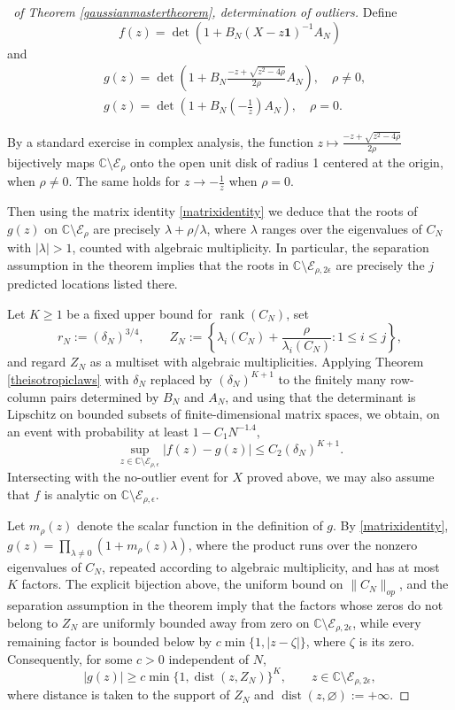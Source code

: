 \documentclass[11pt,reqno]{amsart}
\theoremstyle{plain}
\theoremstyle{remark}
\numberwithin{equation}{section}
\begin{document}
\begin{proof}[\proofname\ of Theorem \ref{gaussianmastertheorem}, determination of outliers]



Define $$f(z)=\det(1+B_N(X-z\mathbf{1})^{-1}A_N)$$
and 
$$\begin{aligned}&g(z)=\det(1+B_N\frac{-z+\sqrt{z^2-4\rho}}{2\rho}A_N),\quad \rho\neq 0,\\&g(z)=\det(1+B_N(-\frac{1}{z})A_N),\quad \rho=0.\end{aligned}$$

By a standard exercise in complex analysis, the function $z\mapsto \frac{-z+\sqrt{z^2-4\rho}}{2\rho}$ bijectively maps $\mathbb{C}\setminus\mathcal{E}_\rho$ onto the open unit disk of radius 1 centered at the origin, when $\rho\neq 0$. The same holds for $z\to-\frac{1}{z}$ when $\rho=0$.

Then using the matrix identity \eqref{matrixidentity} we deduce that the roots of $g(z)$ on $\mathbb{C}\setminus\mathcal{E}_\rho$ are precisely $\lambda+\rho/\lambda$, where $\lambda$ ranges over the eigenvalues of $C_N$ with $|\lambda|>1$, counted with algebraic multiplicity. In particular, the separation assumption in the theorem implies that the roots in $\mathbb{C}\setminus\mathcal{E}_{\rho,2\epsilon}$ are precisely the $j$ predicted locations listed there.
 
Let $K\geq 1$ be a fixed upper bound for $\operatorname{rank}(C_N)$, set
\[
r_N:=(\delta_N)^{3/4},\qquad
Z_N:=\left\{\lambda_i(C_N)+\frac{\rho}{\lambda_i(C_N)}:1\leq i\leq j\right\},
\]
and regard $Z_N$ as a multiset with algebraic multiplicities. Applying Theorem \ref{theisotropiclaws} with $\delta_N$ replaced by $(\delta_N)^{K+1}$ to the finitely many row-column pairs determined by $B_N$ and $A_N$, and using that the determinant is Lipschitz on bounded subsets of finite-dimensional matrix spaces, we obtain, on an event with probability at least $1-C_1N^{-1.4}$,
\[
\sup_{z\in\mathbb{C}\setminus\mathcal{E}_{\rho,\epsilon}}|f(z)-g(z)|
\leq C_2(\delta_N)^{K+1}.
\]
Intersecting with the no-outlier event for $X$ proved above, we may also assume that $f$ is analytic on $\mathbb{C}\setminus\mathcal{E}_{\rho,\epsilon}$.

Let $m_\rho(z)$ denote the scalar function in the definition of $g$. By \eqref{matrixidentity},
$g(z)=\prod_{\lambda\neq0}(1+m_\rho(z)\lambda)$, where the product runs over the nonzero eigenvalues of $C_N$, repeated according to algebraic multiplicity, and has at most $K$ factors. The explicit bijection above, the uniform bound on $\|C_N\|_{op}$, and the separation assumption in the theorem imply that the factors whose zeros do not belong to $Z_N$ are uniformly bounded away from zero on $\mathbb{C}\setminus\mathcal{E}_{\rho,2\epsilon}$, while every remaining factor is bounded below by $c\min\{1,|z-\zeta|\}$, where $\zeta$ is its zero. Consequently, for some $c>0$ independent of $N$,
\[
|g(z)|\geq c\min\{1,\operatorname{dist}(z,Z_N)\}^{K},
\qquad z\in\mathbb{C}\setminus\mathcal{E}_{\rho,2\epsilon},
\]
where distance is taken to the support of $Z_N$ and $\operatorname{dist}(z,\varnothing):=+\infty$.


\end{proof}
\end{document}
